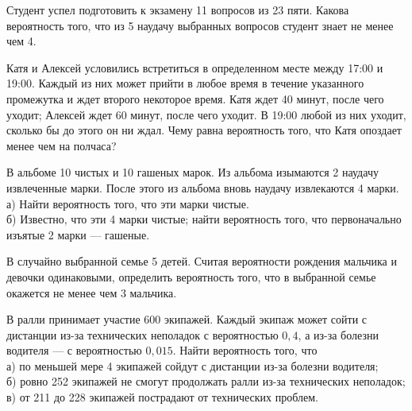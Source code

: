 \newpage\setcounter{zad}{0}



\begin{zkrW}{20}\noindent 
	Студент успел подготовить к экзамену 11 вопросов из 23 пяти. Какова вероятность того, что из 5 наудачу выбранных вопросов студент знает не менее чем 4.
 
\end{zkrW}

\begin{zkrW}{20}\noindent 
	Катя и Алексей условились встретиться в определенном месте между 17:00 и 19:00. Каждый из них может прийти в любое время в течение указанного промежутка и ждет второго некоторое время. Катя ждет 40 минут, после чего уходит; Алексей ждет 60 минут, после чего уходит. В 19:00 любой из них уходит, сколько бы до этого он ни ждал. Чему равна вероятность того, что Катя опоздает менее чем на полчаса?
 
\end{zkrW}

\begin{zkrW}{20}\noindent 
	В альбоме 10 чистых и 10 гашеных марок. Из альбома изымаются 2 наудачу извлеченные марки. После этого из альбома вновь наудачу извлекаются 4 марки. \\ \indent а) Найти вероятность того, что эти марки чистые. \\ \indent б) Известно, что эти 4 марки чистые; найти вероятность того, что первоначально изъятые 2 марки --- гашеные.
 
\end{zkrW}

\begin{zkrW}{20}\noindent 
	В случайно выбранной семье 5 детей. Считая вероятности рождения мальчика и девочки одинаковыми, определить вероятность того, что в выбранной семье окажется не менее чем 3 мальчика.
 
\end{zkrW}

\begin{zkrW}{20}\noindent 
	В ралли принимает участие 600 экипажей. Каждый экипаж может сойти с дистанции из-за технических неполадок с вероятностью $0{,}4$, а из-за болезни водителя --- с вероятностью $0{,}015$. Найти вероятность того, что \\ \indent а) по меньшей мере 4 экипажей сойдут с дистанции из-за болезни водителя; \\ \indent б) ровно 252 экипажей не смогут продолжать ралли из-за технических неполадок; \\ \indent в) от 211 до 228 экипажей пострадают от технических проблем.
 
\end{zkrW}

